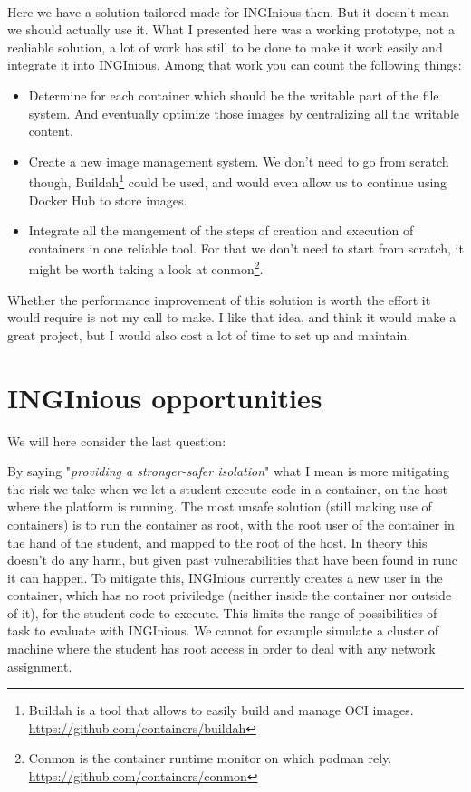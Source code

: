 \paragraph{}Here we have a solution tailored-made for INGInious then.  But it doesn't mean we should actually use it.  What I presented here was a working prototype, not a realiable solution, a lot of work has still to be done to make it work easily and integrate it into INGInious.  Among that work you can count the following things:
\begin{itemize}
  \item Determine for each container which should be the writable part of the file system.  And eventually optimize those images by centralizing all the writable content.
  \item Create a new image management system.  We don't need to go from scratch though, Buildah\footnote{Buildah is a tool that allows to easily build and manage OCI images. \href{https://github.com/containers/buildah}{https://github.com/containers/buildah}} could be used, and would even allow us to continue using Docker Hub to store images.
  \item Integrate all the mangement of the steps of creation and execution of containers in one reliable tool.  For that we don't need to start from scratch, it might be worth taking a look at conmon\footnote{Conmon is the container runtime monitor on which podman rely.  \href{https://github.com/containers/conmon}{https://github.com/containers/conmon}}.
\end{itemize}

Whether the performance improvement of this solution is worth the effort it would require is not my call to make. I like that idea, and think it would make a great project, but I would also cost a lot of time to set up and maintain.

\section{INGInious opportunities}
We will here consider the last question:
\begin{center}
\end{center}

By saying "\textit{providing a stronger-safer isolation}" what I mean is more mitigating the risk we take when we let a student execute code in a container, on the host where the platform is running.  The most unsafe solution (still making use of containers) is to run the container as root, with the root user of the container in the hand of the student, and mapped to the root of the host.  In theory this doesn't do any harm, but given past vulnerabilities that have been found in runc it can happen.  To mitigate this, INGInious currently creates a new user in the container, which has no root priviledge (neither inside the container nor outside of it), for the student code to execute.  This limits the range of possibilities of task to evaluate with INGInious.  We cannot for example simulate a cluster of machine where the student has root access in order to deal with any network assignment.

